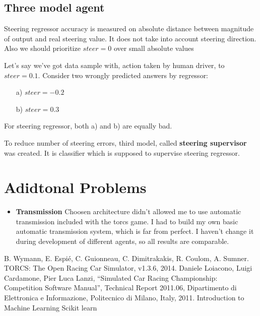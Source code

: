 \documentclass[declaration,shortabstract,english,inz]{iithesis}
\begin{document}
\section{Three model agent}

Steering regressor accuracy is measured on absolute distance between magnitude of output and real steering value. It does not take into account steering direction. Also we should prioritize $steer = 0$ over small absolute values


Let's say we've got data sample with, action taken by human driver, to $steer=0.1$. Consider two wrongly predicted answers by regressor:
\begin{itemize}
    \item[a)] $steer=-0.2$
    \item[b)] $steer=0.3$
\end{itemize}


For steering regressor, both a) and b) are equally bad.


To reduce number of steering errors, third model, called \textbf{steering supervisor} was created. It is classifier which is supposed to supervise steering regressor.



\chapter{Adidtonal Problems}

\begin{itemize}
    \item \textbf{Transmission} Choosen architecture didn't allowed me to use automatic transmission included with the torcs game. I had to build my own basic automatic transmission system, which is far from perfect. I haven't change it during development of different agents, so all results are comparable. 
\end{itemize}



\begin{thebibliography}{1}
 B. Wymann, E. Espié, C. Guionneau, C. Dimitrakakis, R. Coulom, A. Sumner. TORCS: The Open Racing Car Simulator, v1.3.6, 2014.
 Daniele Loiacono, Luigi Cardamone, Pier Luca Lanzi, “Simulated Car
Racing Championship: Competition Software Manual”, Technical Report 2011.06, Dipartimento
di Elettronica e Informazione, Politecnico di Milano, Italy, 2011.
 Introduction to Machine Learning
 Scikit learn

\end{thebibliography}
\end{document}
